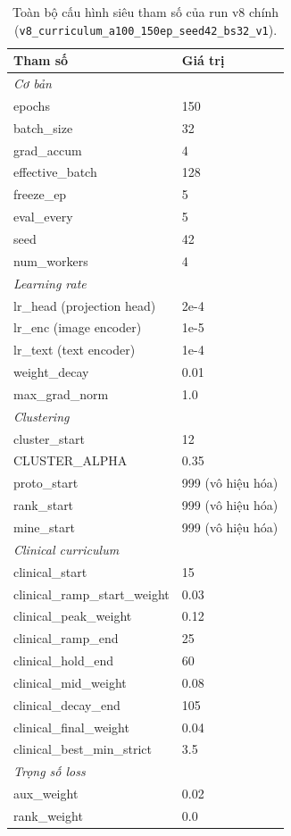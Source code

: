 \documentclass[12pt, a4paper]{article}
\begin{document}
\begin{table}[H]
  \centering
  \caption{Toàn bộ cấu hình siêu tham số của run v8 chính
    (\texttt{v8\_curriculum\_a100\_150ep\_seed42\_bs32\_v1}).}
  \label{tab:full_config}
  \small
  \begin{tabular}{ll}
    \toprule
    \textbf{Tham số} & \textbf{Giá trị} \\
    \midrule
    \multicolumn{2}{l}{\textit{Cơ bản}} \\
    epochs & 150 \\
    batch\_size & 32 \\
    grad\_accum & 4 \\
    effective\_batch & 128 \\
    freeze\_ep & 5 \\
    eval\_every & 5 \\
    seed & 42 \\
    num\_workers & 4 \\
    \midrule
    \multicolumn{2}{l}{\textit{Learning rate}} \\
    lr\_head (projection head) & 2e-4 \\
    lr\_enc (image encoder) & 1e-5 \\
    lr\_text (text encoder) & 1e-4 \\
    weight\_decay & 0.01 \\
    max\_grad\_norm & 1.0 \\
    \midrule
    \multicolumn{2}{l}{\textit{Clustering}} \\
    cluster\_start & 12 \\
    CLUSTER\_ALPHA & 0.35 \\
    proto\_start & 999 (vô hiệu hóa) \\
    rank\_start & 999 (vô hiệu hóa) \\
    mine\_start & 999 (vô hiệu hóa) \\
    \midrule
    \multicolumn{2}{l}{\textit{Clinical curriculum}} \\
    clinical\_start & 15 \\
    clinical\_ramp\_start\_weight & 0.03 \\
    clinical\_peak\_weight & 0.12 \\
    clinical\_ramp\_end & 25 \\
    clinical\_hold\_end & 60 \\
    clinical\_mid\_weight & 0.08 \\
    clinical\_decay\_end & 105 \\
    clinical\_final\_weight & 0.04 \\
    clinical\_best\_min\_strict & 3.5 \\
    \midrule
    \multicolumn{2}{l}{\textit{Trọng số loss}} \\
    aux\_weight & 0.02 \\
    rank\_weight & 0.0 \\
    \bottomrule
  \end{tabular}
\end{table}
\end{document}
